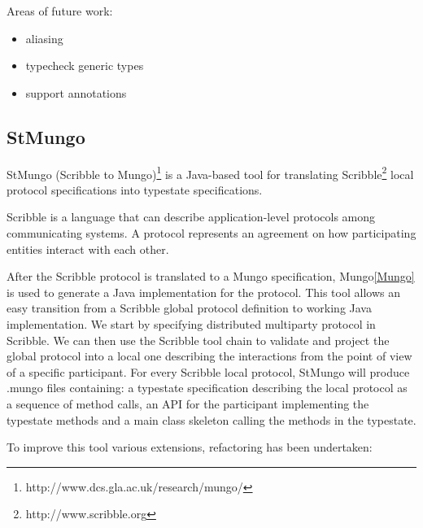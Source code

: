 Areas of future work:
\begin{itemize}
  \item aliasing
  \item typecheck generic types
  \item support annotations
\end{itemize}

\subsection{StMungo}
\label{sub:StMungo}

StMungo (Scribble to Mungo)\footnote{http://www.dcs.gla.ac.uk/research/mungo/} is a Java-based tool for translating Scribble\footnote{http://www.scribble.org} local protocol specifications into typestate specifications.

Scribble is a language that can describe application-level protocols among communicating systems. A protocol represents an agreement on how participating entities interact with each other.

After the Scribble protocol is translated to a Mungo specification, Mungo\ref{Mungo} is used to generate a Java implementation for the protocol. This tool allows an easy transition from a Scribble global protocol definition to working Java implementation. We start by specifying distributed multiparty protocol in Scribble. We can then use the Scribble tool chain to validate and project the global protocol into a local one describing the interactions from the point of view of a specific participant. For every Scribble local protocol, StMungo will produce .mungo files containing: a typestate specification describing the local protocol as a sequence of method calls, an API for the participant implementing the typestate methods and a main class skeleton calling the methods in the typestate.

To improve this tool various extensions, refactoring has been undertaken:

